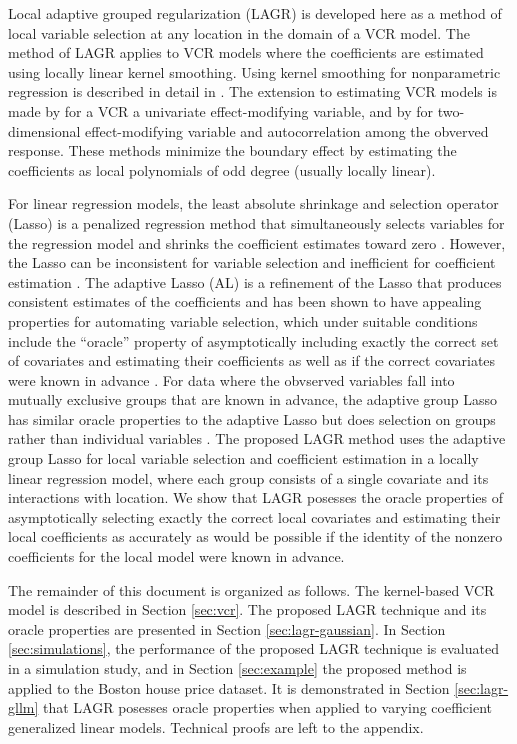 \documentclass[12pt,english,authoryear, review]{article}\usepackage[]{graphicx}\usepackage[]{color}
\theoremstyle{plain}
\theoremstyle{plain}
\begin{document}
Local adaptive grouped regularization (LAGR) is developed here as
a method of local variable selection at any location in the domain
of a VCR model. The method of LAGR applies to VCR models where the
coefficients are estimated using locally linear kernel smoothing.
Using kernel smoothing for nonparametric regression is described in
detail in \citet*{Fan-Gijbels-1996}. The extension to estimating
VCR models is made by \citet{Fan-Zhang-1999} for a VCR a univariate
effect-modifying variable, and by \citet{Sun-Yan-Zhang-Lu-2014} for
two-dimensional effect-modifying variable and autocorrelation among
the obverved response. These methods minimize the boundary effect
\citep{Hastie:1993b} by estimating the coefficients as local polynomials
of odd degree (usually locally linear).

For linear regression models, the least absolute shrinkage and selection
operator (Lasso) is a penalized regression method that simultaneously
selects variables for the regression model and shrinks the coefficient
estimates toward zero \citep{Tibshirani-1996}. However, the Lasso
can be inconsistent for variable selection and inefficient for coefficient
estimation \citep{Zou-2006}. The adaptive Lasso (AL) is a refinement
of the Lasso that produces consistent estimates of the coefficients
and has been shown to have appealing properties for automating variable
selection, which under suitable conditions include the ``oracle''
property of asymptotically including exactly the correct set of covariates
and estimating their coefficients as well as if the correct covariates
were known in advance \citep{Zou-2006}. For data where the obvserved
variables fall into mutually exclusive groups that are known in advance,
the adaptive group Lasso has similar oracle properties to the adaptive
Lasso but does selection on groups rather than individual variables
\citep{Yuan-Lin-2006,Wang-Leng-2008}. The proposed LAGR method uses
the adaptive group Lasso for local variable selection and coefficient
estimation in a locally linear regression model, where each group
consists of a single covariate and its interactions with location.
We show that LAGR posesses the oracle properties of asymptotically
selecting exactly the correct local covariates and estimating their
local coefficients as accurately as would be possible if the identity
of the nonzero coefficients for the local model were known in advance.

The remainder of this document is organized as follows. The kernel-based
VCR model is described in Section \ref{sec:vcr}. The proposed LAGR
technique and its oracle properties are presented in Section \ref{sec:lagr-gaussian}.
In Section \ref{sec:simulations}, the performance of the proposed
LAGR technique is evaluated in a simulation study, and in Section
\ref{sec:example} the proposed method is applied to the Boston house
price dataset. It is demonstrated in Section \ref{sec:lagr-gllm}
that LAGR posesses oracle properties when applied to varying coefficient
generalized linear models. Technical proofs are left to the appendix.
\end{document}
